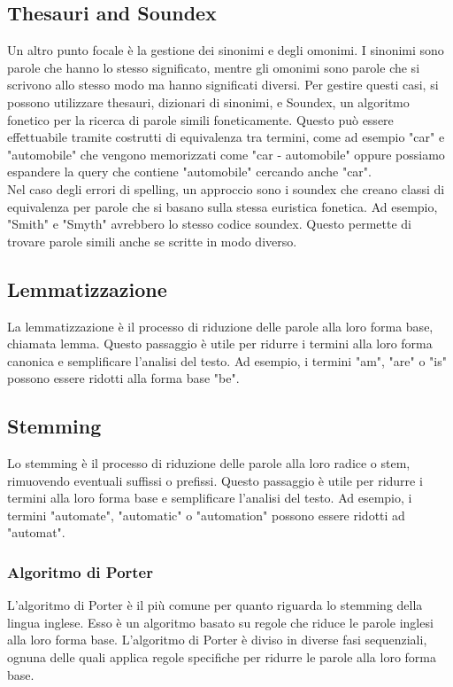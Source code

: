 \documentclass{report}
\begin{document}
	\subsection{Thesauri and Soundex}
	Un altro punto focale è la gestione dei sinonimi e degli omonimi. I sinonimi sono parole che hanno lo stesso significato, mentre gli omonimi sono parole che si scrivono allo stesso modo ma hanno significati diversi. Per gestire questi casi, si possono utilizzare thesauri, dizionari di sinonimi, e Soundex, un algoritmo fonetico per la ricerca di parole simili foneticamente. Questo può essere effettuabile tramite costrutti di equivalenza tra termini, come ad esempio "car" e "automobile" che vengono memorizzati come "car - automobile" oppure possiamo espandere la query che contiene "automobile" cercando anche "car".
	\vspace{\baselineskip}\\
	Nel caso degli errori di spelling, un approccio sono i soundex che creano classi di equivalenza per parole che si basano sulla stessa euristica fonetica. Ad esempio, "Smith" e "Smyth" avrebbero lo stesso codice soundex. Questo permette di trovare parole simili anche se scritte in modo diverso.

	\subsection{Lemmatizzazione}
	La lemmatizzazione è il processo di riduzione delle parole alla loro forma base, chiamata lemma. Questo passaggio è utile per ridurre i termini alla loro forma canonica e semplificare l'analisi del testo. Ad esempio, i termini "am", "are" o "is" possono essere ridotti alla forma base "be". 

	\subsection{Stemming}
	Lo stemming è il processo di riduzione delle parole alla loro radice o stem, rimuovendo eventuali suffissi o prefissi. Questo passaggio è utile per ridurre i termini alla loro forma base e semplificare l'analisi del testo. Ad esempio, i termini "automate", "automatic" o "automation" possono essere ridotti ad "automat".

	\subsubsection{Algoritmo di Porter}
	L'algoritmo di Porter è il più comune per quanto riguarda lo stemming della lingua inglese. Esso è un algoritmo basato su regole che riduce le parole inglesi alla loro forma base. L'algoritmo di Porter è diviso in diverse fasi sequenziali, ognuna delle quali applica regole specifiche per ridurre le parole alla loro forma base. 
\end{document}
